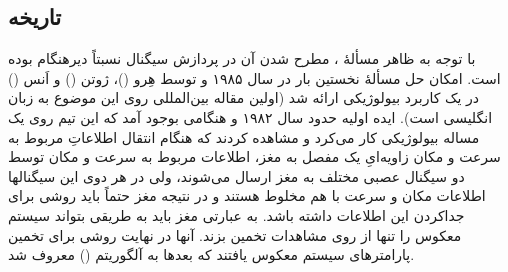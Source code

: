 \subsection{تاریخه }
با توجه به ظاهر   مسألهٔ ، مطرح شدن آن در پردازش سیگنال نسبتاً
دیرهنگام بوده است. امکان حل مسألهٔ  نخستین بار در سال  ۱۹۸۵ و توسط
هِرو ()، ژوتن () و اَنس () در یک کاربرد بیولوژیکی ارائه شد 
\cite{HeraJA85} (اولین مقاله بین‌المللی روی این موضوع به زبان انگلیسی
\cite{HeraJ86} است). ایده اولیه حدود سال ۱۹۸۲ و هنگامی بوجود آمد
که این تیم روی یک مساله بیولوژیکی کار می‌کرد و مشاهده کردند که هنگام
انتقال اطلاعاتِ مربوط به سرعت و مکان زاویه‌ایِ یک مفصل به مغز، اطلاعات
مربوط به سرعت و مکان توسط دو سیگنال عصبی مختلف به مغز ارسال
می‌شوند، ولی در هر دوی این سیگنالها اطلاعات مکان و سرعت با هم مخلوط
هستند و در نتیجه مغز حتماً باید روشی برای جداکردن این اطلاعات داشته باشد.
به عبارتی مغز باید به طریقی بتواند سیستم معکوس را تنها از روی مشاهدات
تخمین بزند. آنها در نهایت روشی برای تخمین پارامترهای سیستم معکوس یافتند
که بعدها به آلگوریتم  () معروف شد.

